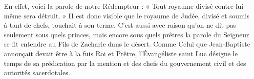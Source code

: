 En effet, voici la parole de notre Rédempteur : « Tout royaume divisé contre lui-même sera détruit. » II est donc visible que le royaume de Judée, divisé et soumis à tant de chefs, touchait à son terme. C’est aussi avec raison qu’on ne dit pas seulement sous quels princes, mais encore sous quels prêtres la parole du Seigneur se fit entendre au Fils de Zacharie dans le désert. Comme Celui que Jean-Baptiste annonçait devait être à la fuis Roi et Prêtre, l’Évangéliste saint Luc désigne le temps de sa prédication par la mention et des chefs du gouvernement civil et des autorités sacerdotales.